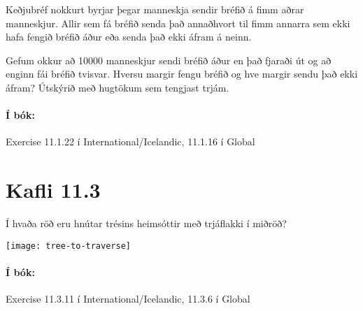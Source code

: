 \documentclass{article}
\begin{document}
\question Keðjubréf nokkurt byrjar þegar manneskja sendir bréfið á fimm aðrar manneskjur. Allir sem fá bréfið senda það annaðhvort til fimm annarra sem ekki hafa fengið bréfið áður eða senda það ekki áfram á neinn.

Gefum okkur að 10000 manneskjur sendi bréfið áður en það fjaraði út og að enginn fái bréfið tvisvar. Hversu margir fengu bréfið og hve margir sendu það ekki áfram? Útskýrið með hugtökum sem tengjast trjám.

\paragraph{Í bók:} Exercise 11.1.22 í International/Icelandic, 11.1.16 í Global

\section{Kafli 11.3}

\question 

Í hvaða röð eru hnútar trésins heimsóttir með trjáflakki í miðröð?

\begin{center}
    \texttt{[image: tree-to-traverse]}
\end{center}

\paragraph{Í bók:} Exercise 11.3.11 í International/Icelandic, 11.3.6 í Global
\end{document}
